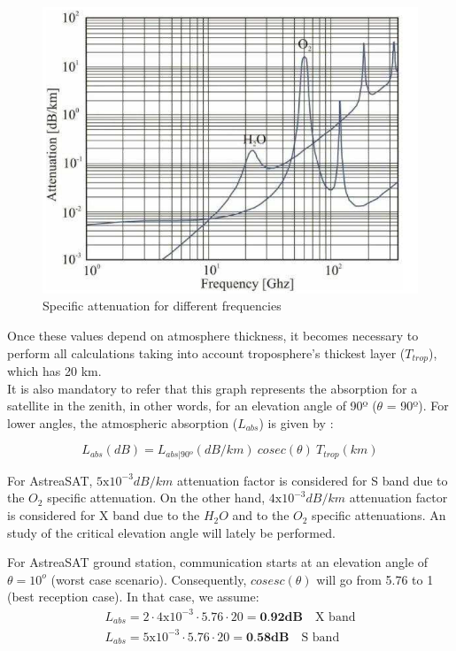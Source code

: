 \begin{figure}[H]
	\includegraphics[scale=0.7]{./sections/SatelliteDept/sections/images/specificAttenuation}
	\centering
	\caption[Specific attenuation for different frequencies]{Specific attenuation for different frequencies \cite{Jorge2012}}
	\label{specificAtenuattion}
\end{figure}

Once these values depend on atmosphere thickness, it becomes necessary to perform all calculations taking into 
account troposphere's thickest layer ($T_{trop}$), which has 20 km.\\
It is also mandatory to refer that this graph represents the absorption for a satellite in the zenith, in other 
words, for an elevation angle of 90º ($\theta$ = 90º). For lower angles, the atmospheric absorption ($L_{abs}$) is  given by \cite{Jorge2012}:

\begin{equation}
	L_{abs}(dB)=L_{abs|90º} (dB/km)\ cosec(\theta)\ T_{trop}(km)
	\label{Labs}
\end{equation}

For AstreaSAT, $5\mathrm{x}10^{-3}dB/km$ attenuation factor is considered for S band due to the $O_2$ specific attenuation. On the other hand, $4\mathrm{x}10^{-3}dB/km$ attenuation factor is considered for X band due to the $H_2O$ and to the $O_2$ specific attenuations. An study of the critical elevation angle will lately be performed. 

For AstreaSAT ground station, communication starts at an elevation angle of $\theta=10^o$ (worst case scenario). Consequently, $cosesc(\theta)$ will go from 5.76 to 1 (best reception case). In that case, we assume:
\begin{align*}
	L_{abs}=2\cdot4\mathrm{x}10^{-3}\cdot5.76\cdot20 =\textbf{0.92dB} \quad \text{X band}\\
	L_{abs}=5\mathrm{x}10^{-3}\cdot5.76\cdot20 =\textbf{0.58dB} \quad \text{S band}
\end{align*}

